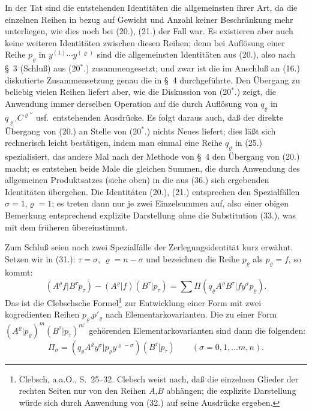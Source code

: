 \documentclass[12pt,a4paper]{article}
\begin{document}
In der Tat sind die entstehenden Identitäten die allgemeinsten ihrer Art, da die einzelnen Reihen in bezug auf Gewicht und Anzahl keiner Beschränkung mehr unterliegen, wie dies noch bei (20.), (21.) der Fall war. Es existieren aber auch keine weiteren Identitäten zwischen diesen Reihen; denn bei Auflösung einer Reihe $p_{\varrho}$ in $y^{(1)} \cdots y^{(\varrho)}$ sind die allgemeinsten Identitäten aus (20.), also nach \S\ 3 (Schluß) aus (20$^{*}$.) zusammengesetzt; und zwar ist die im Anschluß an (16.) diskutierte Zusammensetzung genau die in \S\ 4 durchgeführte. Den Übergang zu beliebig vielen Reihen liefert aber, wie die Diskussion von (20$^{*}$.) zeigt, die Anwendung immer derselben Operation auf die durch Auflösung von $q_{\varrho}$ in $q_{\varrho'} C^{\varrho''}$ usf.\ entstehenden Ausdrücke. Es folgt daraus auch, daß der direkte Übergang von (20.) an Stelle von (20$^{*}$.) nichts Neues liefert; dies läßt sich rechnerisch leicht bestätigen, indem man einmal eine Reihe $q_{\varrho}$ in (25.) spezialisiert, das andere Mal nach der Methode von \S\ 4 den Übergang von (20.) macht; es entstehen beide Male die gleichen Summen, die durch Anwendung des allgemeinen Produktsatzes (siehe oben) in die aus (36.) sich ergebenden Identitäten übergehen. Die Identitäten (20.), (21.) entsprechen den Spezialfällen $\sigma = 1$,$\varrho = 1$; es treten dann nur je zwei Einzelsummen auf, also einer obigen Bemerkung entsprechend explizite Darstellung ohne die Substitution (33.), was mit dem früheren übereinstimmt.

Zum Schluß seien noch zwei Spezialfälle der Zerlegungsidentität kurz erwähnt. Setzen wir in (31.): $\tau = \sigma$, $\varrho = n-\sigma$ und bezeichnen die Reihe $p_{\varrho}$ als $p_{\varrho} = f$, so kommt:
\begin{equation}\tag{37}
(A^{\varrho} f | B^{\tau} p_{\tau}) - (A^{\varrho} | f)(B^{\tau} | p_{\tau}) = \sum \Pi (q_{\varrho} A^{\varrho} B^{\tau} | f y^{\sigma} p_{\varrho}).
\end{equation}
Das ist die Clebschsche Formel\footnote{Clebsch, a.a.O., S.~25--32. Clebsch weist nach, daß die einzelnen Glieder der rechten Seiten nur von den Reihen $A$,$B$ abhängen; die explizite Darstellung würde sich durch Anwendung von (32.) auf seine Ausdrücke ergeben.} zur Entwicklung einer Form mit zwei kogredienten Reihen $p_{\varrho}$,$p'_{\varrho}$ nach Elementarkovarianten. Die zu einer Form $(A^{\varrho} | p_{\varrho})^{m} (B^{\tau} | p_{\tau})^{m'}$ gehörenden Elementarkovarianten sind dann die folgenden:
\begin{equation}\tag{38}
\Pi_{\sigma} = (q_{\varrho} A^{\varrho} y^{\sigma} | p_{\varrho} y^{\varrho-\sigma}) (B^{\tau} | p_{\tau}) \qquad (\sigma = 0, 1, \ldots m, n).
\end{equation}
\end{document}
